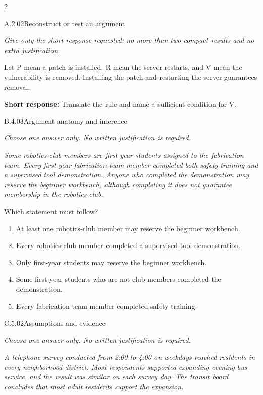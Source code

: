 \documentclass[9pt]{extarticle}
\newcommand{\choice}[1]{\item #1}
\begin{document}
\CoreWorkArea
\FormBreak
{}
\begin{multicols}{2}
\begin{DenseCoreProblem}{A.2.02}{Reconstruct or test an argument}
{\scriptsize\textit{Give only the short response requested: no more than two compact results and no extra justification.}\par}
Let P mean a patch is installed, R mean the server restarts, and V mean the vulnerability is removed. Installing the patch and restarting the server guarantees removal.

\textbf{Short response:} Translate the rule and name a sufficient condition for V.
\end{DenseCoreProblem}
\begin{DenseCoreProblem}{B.4.03}{Argument anatomy and inference}
{\scriptsize\textit{Choose one answer only. No written justification is required.}\par}
\emph{Some robotics-club members are first-year students assigned to the fabrication team. Every first-year fabrication-team member completed both safety training and a supervised tool demonstration. Anyone who completed the demonstration may reserve the beginner workbench, although completing it does not guarantee membership in the robotics club.}

Which statement must follow?
\begin{enumerate}[label=(\alph*)]
  \choice{At least one robotics-club member may reserve the beginner workbench.}
  \choice{Every robotics-club member completed a supervised tool demonstration.}
  \choice{Only first-year students may reserve the beginner workbench.}
  \choice{Some first-year students who are not club members completed the demonstration.}
  \choice{Every fabrication-team member completed safety training.}
\end{enumerate}
\end{DenseCoreProblem}
\columnbreak
\begin{DenseCoreProblem}{C.5.02}{Assumptions and evidence}
{\scriptsize\textit{Choose one answer only. No written justification is required.}\par}
\emph{A telephone survey conducted from 2:00 to 4:00 on weekdays reached residents in every neighborhood district. Most respondents supported expanding evening bus service, and the result was similar on each survey day. The transit board concludes that most adult residents support the expansion.}


\end{DenseCoreProblem}
\end{multicols}
\end{document}

